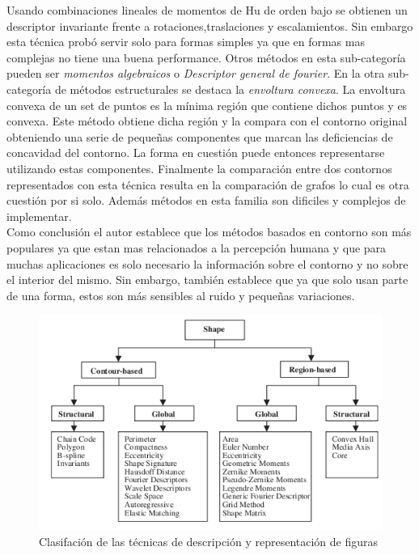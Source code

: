 Usando combinaciones lineales de momentos de Hu de orden bajo se obtienen un descriptor 
invariante frente a rotaciones,traslaciones y escalamientos. Sin embargo esta técnica probó servir solo 
para formas simples ya que en formas mas complejas no tiene una buena performance. Otros métodos en esta
sub-categoría pueden ser \textit{momentos algebraicos} o \textit{Descriptor general de fourier}. En la otra sub-categoría de métodos
estructurales se destaca la \textit{envoltura convexa}. La envoltura convexa de un set de puntos es la mínima región que contiene 
dichos puntos y es convexa. Este método obtiene dicha región y la compara con el contorno original obteniendo una serie de pequeñas
componentes que marcan las deficiencias de concavidad del contorno. La forma en cuestión puede entonces representarse utilizando estas componentes.
Finalmente la comparación entre dos contornos representados con esta técnica resulta en la comparación de grafos lo cual es otra
cuestión por si solo. Además métodos en esta familia son dificiles y complejos de implementar.\\
\indent Como conclusión el autor establece que los métodos basados en contorno son más populares ya que estan mas relacionados
a la percepción humana y que para muchas aplicaciones es solo necesario la información sobre el contorno y no sobre el interior del mismo.
Sin embargo, también establece que ya que solo usan parte de una forma, estos son más sensibles al ruido y pequeñas variaciones.

\begin{figure}[tpb]
\begin{center}
  \includegraphics[scale=0.55]{figuras/shapess.png}
\end{center}
  \caption{Clasifación de las técnicas de descripción y representación de figuras}
  \label{fig:review_shape}
\end{figure}

